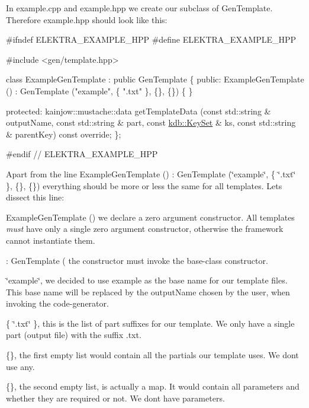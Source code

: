 In {\ttfamily example.\+cpp} and {\ttfamily example.\+hpp} we create our subclass of {\ttfamily Gen\+Template}. Therefore {\ttfamily example.\+hpp} should look like this\+:


\begin{DoxyCode}
\textcolor{preprocessor}{#ifndef ELEKTRA\_EXAMPLE\_HPP}
\textcolor{preprocessor}{#define ELEKTRA\_EXAMPLE\_HPP}

\textcolor{preprocessor}{#include <gen/template.hpp>}

\textcolor{keyword}{class }ExampleGenTemplate : \textcolor{keyword}{public} GenTemplate
\{
\textcolor{keyword}{public}:
    ExampleGenTemplate () : GenTemplate (\textcolor{stringliteral}{"example"}, \{ \textcolor{stringliteral}{".txt"} \}, \{\}, \{\})
    \{
    \}

\textcolor{keyword}{protected}:
    kainjow::mustache::data getTemplateData (\textcolor{keyword}{const} std::string & outputName, \textcolor{keyword}{const} std::string & part, \textcolor{keyword}{
      const} \hyperlink{classkdb_1_1KeySet}{kdb::KeySet} & ks,
                                             \textcolor{keyword}{const} std::string & parentKey) \textcolor{keyword}{const override};
\};

\textcolor{preprocessor}{#endif // ELEKTRA\_EXAMPLE\_HPP}
\end{DoxyCode}


Apart from the line {\ttfamily Example\+Gen\+Template () \+: Gen\+Template (\char`\"{}example\char`\"{}, \{ \char`\"{}.\+txt\char`\"{} \}, \{\}, \{\})} everything should be more or less the same for all templates. Let\textquotesingle{}s dissect this line\+:


\begin{DoxyItemize}
\item {\ttfamily Example\+Gen\+Template ()} we declare a zero argument constructor. All templates {\itshape must} have only a single zero argument constructor, otherwise the framework cannot instantiate them.
\item {\ttfamily \+: Gen\+Template (} the constructor must invoke the base-\/class constructor.
\item {\ttfamily \char`\"{}example\char`\"{},} we decided to use {\ttfamily example} as the base name for our template files. This base name will be replaced by the {\ttfamily output\+Name} chosen by the user, when invoking the code-\/generator.
\item {\ttfamily \{ \char`\"{}.\+txt\char`\"{} \},} this is the list of part suffixes for our template. We only have a single part (output file) with the suffix {\ttfamily .txt}.
\item {\ttfamily \{\},} the first empty list would contain all the partials our template uses. We don\textquotesingle{}t use any.
\item {\ttfamily \{\},} the second empty list, is actually a map. It would contain all parameters and whether they are required or not. We don\textquotesingle{}t have parameters.
\end{DoxyItemize}

